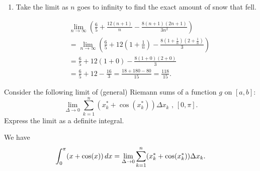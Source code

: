 \documentclass[ nooutcomes]{ximera}
\begin{document}
\begin{problem}
\begin{enumerate}
		
		
	\item  Take the limit as $n$ goes to infinity to find the exact amount of snow that fell.
		\begin{freeResponse}
			\begin{align*}
			&  \lim_{n \to \infty} \left( \frac{6}{5} + \frac{12(n+1)}{n} - \frac{8(n+1)(2n+1)}{3n^2} \right)  \\
			&= \lim_{n \to \infty} \left( \frac{6}{5} + 12 \left( 1 + \frac{1}{n} \right) - \frac{8(1 + \frac{1}{n})(2 + \frac{1}{n})}{3} \right)  \\
			&= \frac{6}{5} + 12(1 + 0) - \frac{8(1+0)(2+0)}{3}  \\
			&= \frac{6}{5} + 12 - \frac{16}{3} = \frac{18 + 180 - 80}{15} = \frac{118}{15}.
			\end{align*}
		\end{freeResponse}
		
		
		
	\end{enumerate}
	
\end{problem}

\begin{problem}
  Consider the following limit of (general) Riemann sums of a function $g$ on $[a, b]$:
  \[
    \lim_{\Delta \to 0} \sum_{k = 1}^n (x_k^* + \cos(x_k^*)) \Delta x_k\mbox{ , $[0, \pi]$.}
  \]
  Express the limit as a definite integral.
  \begin{freeResponse}
    We have 
    \[
      \int_0^\pi(x + \cos(x))\d x = \lim_{\Delta \to 0} \sum_{k = 1}^n (x_k^* + \cos(x_k^*)) \Delta x_k.
    \]
  \end{freeResponse}
\end{problem}
\end{document}
